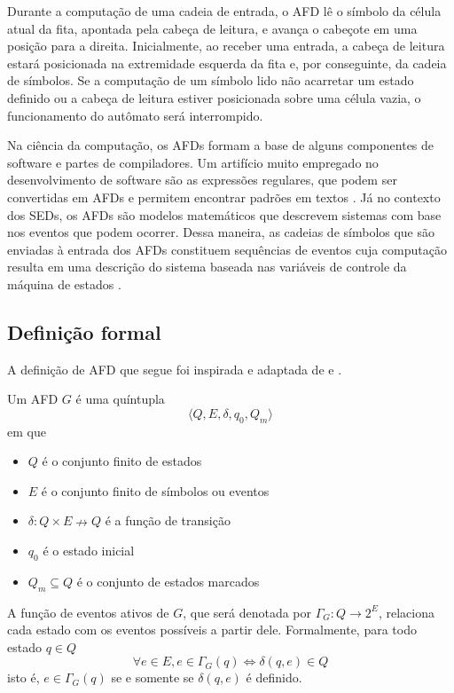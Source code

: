 Durante a computação de uma cadeia de entrada, o AFD lê o símbolo da célula atual da fita, apontada pela cabeça de leitura, e avança o cabeçote em uma posição para a direita. Inicialmente, ao receber uma entrada, a cabeça de leitura estará posicionada na extremidade esquerda da fita e, por conseguinte, da cadeia de símbolos. Se a computação de um símbolo lido não acarretar um estado definido ou a cabeça de leitura estiver posicionada sobre uma célula vazia, o funcionamento do autômato será interrompido.

Na ciência da computação, os AFDs formam a base de alguns componentes de software e partes de compiladores. Um artifício muito empregado no desenvolvimento de software são as expressões regulares, que podem ser convertidas em AFDs e permitem encontrar padrões em textos \cite{hopcroft}. Já no contexto dos \acs{SED}s, os AFDs são modelos matemáticos que descrevem sistemas com base nos eventos que podem ocorrer. Dessa maneira, as cadeias de símbolos que são enviadas à entrada dos AFDs constituem sequências de eventos cuja computação resulta em uma descrição do sistema baseada nas variáveis de controle da máquina de estados \cite{cassandras}.

\subsection{Definição formal}

A definição de \acs{AFD} que segue foi inspirada e adaptada de  e .

Um AFD $G$ é uma quíntupla \begin{equation}
\label{eq:afd}
\langle Q, E, \delta, q_0, Q_m \rangle
\end{equation} em que \begin{itemize}[label={}]
  \item $Q$ é o conjunto finito de estados
  \item $E$ é o conjunto finito de símbolos ou eventos
  \item $\delta:Q \times E \nrightarrow Q$ é a função de transição
  \item $q_0 $ é o estado inicial
  \item $Q_m \subseteq Q$ é o conjunto de estados marcados
\end{itemize}

A função de eventos ativos de $G$, que será denotada por $\Gamma_G:Q \to 2^E$, relaciona cada estado com os eventos possíveis a partir dele. Formalmente, para todo estado $q \in Q$ $$\forall e \in E, e \in \Gamma_G(q) \Leftrightarrow \delta(q, e) \in Q$$ isto é, $e \in \Gamma_G(q)$ se e somente se $\delta(q, e)$ é definido.

